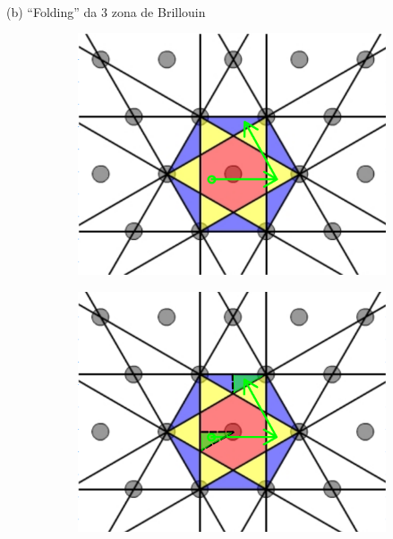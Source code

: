 \documentclass[aspectratio=169]{beamer}
\begin{document}


\begin{frame}{(b) ``Folding'' da 3\textsuperscript{} zona de Brillouin}

\begin{figure}[H]
\centering
\begin{subfigure}{.45\textwidth}
  \centering
  \includegraphics[width=\linewidth]{fig/3rd_bz-folding_1.png}
\end{subfigure}%
\quad \quad
\begin{subfigure}{.45\textwidth}
  \centering
  \includegraphics[width=\linewidth]{fig/3rd_bz-folding_2.png}
\end{subfigure}
\end{figure}

\end{frame}
\end{document}
